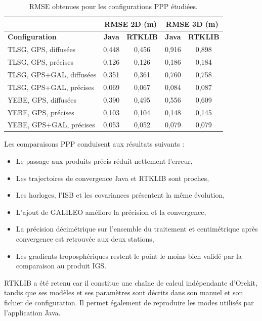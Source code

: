 {\begin{table}[H]
\centering
\small
\setlength{\tabcolsep}{4pt}
\begin{tabular}{|l|c|c|c|c|}
\hline
\multicolumn{1}{|c|}{} & \multicolumn{2}{c|}{\textbf{RMSE 2D (m)}} &
  \multicolumn{2}{c|}{\textbf{RMSE 3D (m)}} \\
\hline
\textbf{Configuration} & \textbf{Java} & \textbf{RTKLIB} &
\textbf{Java} & \textbf{RTKLIB} \\
\hline
TLSG, GPS, diffusées       & 0,448 & 0,456 & 0,916 & 0,898 \\
\hline
TLSG, GPS, précises        & 0,126 & 0,126 & 0,186 & 0,184 \\
\hline
TLSG, GPS+GAL, diffusées   & 0,351 & 0,361 & 0,760 & 0,758 \\
\hline
TLSG, GPS+GAL, précises    & 0,069 & 0,067 & 0,084 & 0,087 \\
\hline
YEBE, GPS, diffusées       & 0,390 & 0,495 & 0,556 & 0,609 \\
\hline
YEBE, GPS, précises        & 0,103 & 0,104 & 0,148 & 0,145 \\
\hline
YEBE, GPS+GAL, précises    & 0,053 & 0,052 & 0,079 & 0,079 \\
\hline
\end{tabular}
\caption{RMSE obtenues pour les configurations PPP étudiées.}
\label{tab:ppp_validation_rmse}
\end{table}

Les comparaisons PPP conduisent aux résultats suivants :

\begin{itemize}
    \item Le passage aux produits précis réduit nettement l'erreur,
    \item Les trajectoires de convergence Java et RTKLIB sont proches,
    \item Les horloges, l'ISB et les covariances présentent la même évolution,
    \item L'ajout de GALILEO améliore la précision et la convergence,
    \item La précision décimétrique sur l'ensemble du traitement et
    centimétrique après convergence est retrouvée aux deux stations,
    \item Les gradients troposphériques restent le point le moins bien validé
    par la comparaison au produit IGS.
\end{itemize}
}

RTKLIB a été retenu car il constitue une chaîne de calcul indépendante
d'Orekit, tandis que ses modèles et ses paramètres sont décrits dans son manuel
et son fichier de configuration. Il permet également de reproduire les modes
utilisés par l'application Java.

